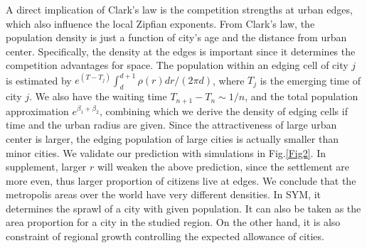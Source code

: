 \documentclass[reprint,unsortedaddress,amsmath,amssymb,aps,prl,showkeys]{revtex4-2}
\begin{document}
A direct implication of Clark's law is the competition strengths at urban edges, which also influence the local Zipfian exponents. From Clark's law, the population density is just a function of city's age and the distance from urban center. Specifically, the density at the edges is important since it determines the competition advantages for space. The population within an edging cell of city $j$ is estimated by $e^{(T-T_j)}\int_{d}^{d+1}\rho(r)dr/(2\pi d)$, where $T_j$ is the emerging time of city $j$. We also have the waiting time $T_{n+1}-T_{n}\sim 1/n$, and the total population approximation $e^{\beta_1+\beta_2}$, combining which we derive the density of edging cells if time and the urban radius are given. Since the attractiveness of large urban center is larger, the edging population of large cities is actually smaller than minor cities. We validate our prediction with simulations in Fig.\@\ref{Fig2}. %
In supplement, larger $r$ will weaken the above prediction, since the settlement are more even, thus larger proportion of citizens live at edges. We conclude that the metropolis areas over the world have very different densities. In SYM, it determines the sprawl of a city with given population. It can also be taken as the area proportion for a city in the studied region. On the other hand, it is also constraint of regional growth controlling the expected allowance of cities.
\end{document}

